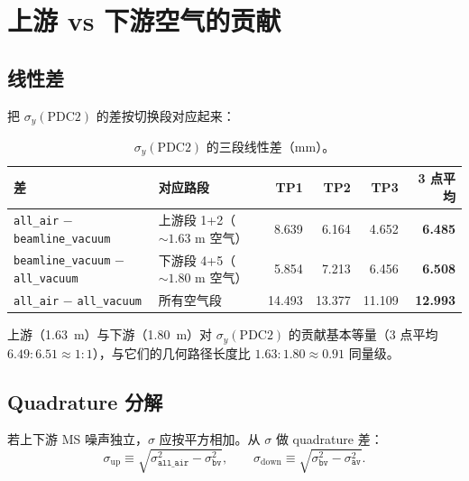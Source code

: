 \documentclass[a4paper, 11pt]{article}
\begin{document}
\section{上游 vs 下游空气的贡献}

\subsection{线性差}

把 $\sigma_y(\mathrm{PDC2})$ 的差按切换段对应起来：

\begin{table}[H]
\centering
\caption{$\sigma_y(\mathrm{PDC2})$ 的三段线性差（mm）。}
\label{tab:delta_linear}
\begin{tabular}{llrrrr}
\toprule
差 & 对应路段 & TP1 & TP2 & TP3 & 3 点平均 \\
\midrule
\texttt{all\_air} $-$ \texttt{beamline\_vacuum}    & 上游段 1+2（$\sim 1.63$ m 空气） &  8.639 &  6.164 &  4.652 & \textbf{6.485} \\
\texttt{beamline\_vacuum} $-$ \texttt{all\_vacuum} & 下游段 4+5（$\sim 1.80$ m 空气） &  5.854 &  7.213 &  6.456 & \textbf{6.508} \\
\texttt{all\_air} $-$ \texttt{all\_vacuum}         & 所有空气段                        & 14.493 & 13.377 & 11.109 & \textbf{12.993} \\
\bottomrule
\end{tabular}
\end{table}

上游（1.63~m）与下游（1.80~m）对 $\sigma_y(\mathrm{PDC2})$ 的贡献基本等量（3 点平均 $6.49 : 6.51 \approx 1:1$），与它们的几何路径长度比 $1.63 : 1.80 \approx 0.91$ 同量级。

\subsection{Quadrature 分解}

若上下游 MS 噪声独立，$\sigma$ 应按平方相加。从 $\sigma$ 做 quadrature 差：
\[
   \sigma_\mathrm{up}   \equiv \sqrt{\sigma_{\mathtt{all\_air}}^{2} - \sigma_{\mathtt{bv}}^{2}}, \qquad
   \sigma_\mathrm{down} \equiv \sqrt{\sigma_{\mathtt{bv}}^{2}     - \sigma_{\mathtt{av}}^{2}}.
\]
\end{document}
